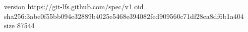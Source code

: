 version https://git-lfs.github.com/spec/v1
oid sha256:3abe0f55bb094c32889b4025e5468e394082fed909560c71df28ca8df6b1a404
size 87544

